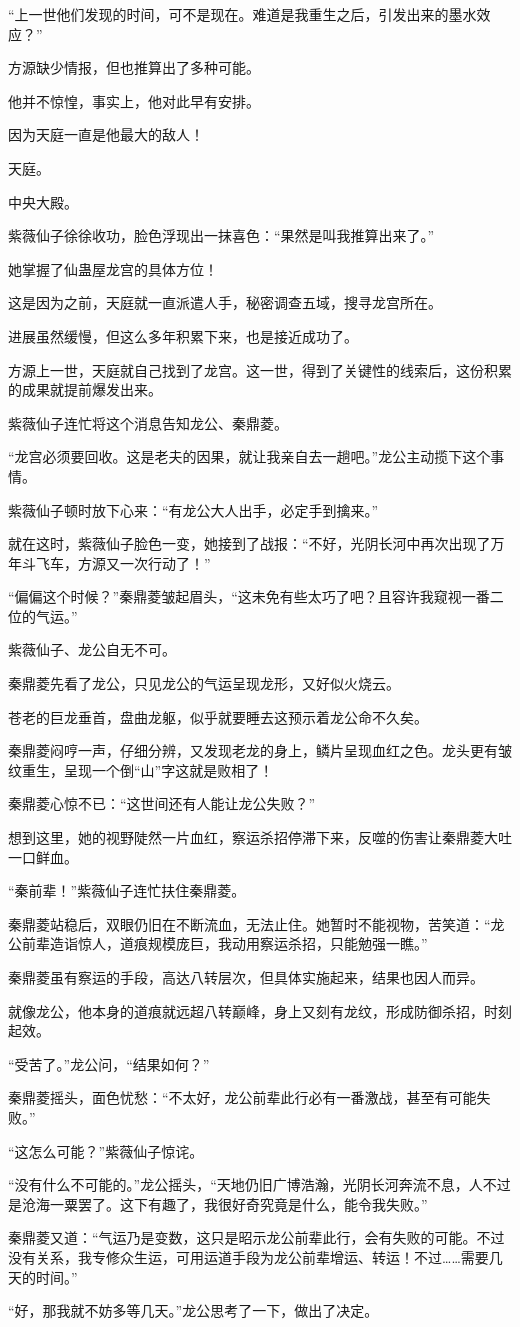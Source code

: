 \begin{this_body}
“上一世他们发现的时间，可不是现在。难道是我重生之后，引发出来的墨水效应？”

方源缺少情报，但也推算出了多种可能。

他并不惊惶，事实上，他对此早有安排。

因为天庭一直是他最大的敌人！

天庭。

中央大殿。

紫薇仙子徐徐收功，脸色浮现出一抹喜色：“果然是叫我推算出来了。”

她掌握了仙蛊屋龙宫的具体方位！

这是因为之前，天庭就一直派遣人手，秘密调查五域，搜寻龙宫所在。

进展虽然缓慢，但这么多年积累下来，也是接近成功了。

方源上一世，天庭就自己找到了龙宫。这一世，得到了关键性的线索后，这份积累的成果就提前爆发出来。

紫薇仙子连忙将这个消息告知龙公、秦鼎菱。

“龙宫必须要回收。这是老夫的因果，就让我亲自去一趟吧。”龙公主动揽下这个事情。

紫薇仙子顿时放下心来：“有龙公大人出手，必定手到擒来。”

就在这时，紫薇仙子脸色一变，她接到了战报：“不好，光阴长河中再次出现了万年斗飞车，方源又一次行动了！”

“偏偏这个时候？”秦鼎菱皱起眉头，“这未免有些太巧了吧？且容许我窥视一番二位的气运。”

紫薇仙子、龙公自无不可。

秦鼎菱先看了龙公，只见龙公的气运呈现龙形，又好似火烧云。

苍老的巨龙垂首，盘曲龙躯，似乎就要睡去这预示着龙公命不久矣。

秦鼎菱闷哼一声，仔细分辨，又发现老龙的身上，鳞片呈现血红之色。龙头更有皱纹重生，呈现一个倒“山”字这就是败相了！

秦鼎菱心惊不已：“这世间还有人能让龙公失败？”

想到这里，她的视野陡然一片血红，察运杀招停滞下来，反噬的伤害让秦鼎菱大吐一口鲜血。

“秦前辈！”紫薇仙子连忙扶住秦鼎菱。

秦鼎菱站稳后，双眼仍旧在不断流血，无法止住。她暂时不能视物，苦笑道：“龙公前辈造诣惊人，道痕规模庞巨，我动用察运杀招，只能勉强一瞧。”

秦鼎菱虽有察运的手段，高达八转层次，但具体实施起来，结果也因人而异。

就像龙公，他本身的道痕就远超八转巅峰，身上又刻有龙纹，形成防御杀招，时刻起效。

“受苦了。”龙公问，“结果如何？”

秦鼎菱摇头，面色忧愁：“不太好，龙公前辈此行必有一番激战，甚至有可能失败。”

“这怎么可能？”紫薇仙子惊诧。

“没有什么不可能的。”龙公摇头，“天地仍旧广博浩瀚，光阴长河奔流不息，人不过是沧海一粟罢了。这下有趣了，我很好奇究竟是什么，能令我失败。”

秦鼎菱又道：“气运乃是变数，这只是昭示龙公前辈此行，会有失败的可能。不过没有关系，我专修众生运，可用运道手段为龙公前辈增运、转运！不过……需要几天的时间。”

“好，那我就不妨多等几天。”龙公思考了一下，做出了决定。

\end{this_body}

